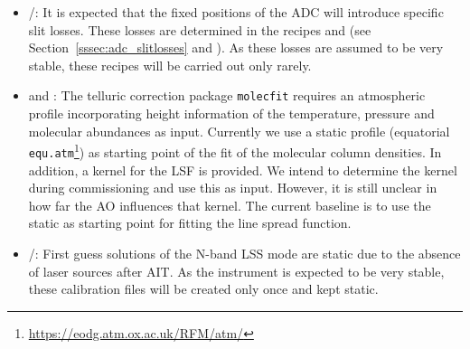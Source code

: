 \begin{itemize}
    \item \hyperref[dataitem:lm_adc_slitloss]{}/\hyperref[dataitem:n_adc_slitloss]{}: It is expected that the fixed positions of the \ac{ADC} will introduce specific slit losses. These losses are determined in the recipes \hyperref[rec:metis_lm_adc_slitloss]{} and \hyperref[rec:metis_n_adc_slitloss]{} (see Section~\ref{sssec:adc_slitlosses} and \cite{METIS-calibration_plan}). As these losses are assumed to be very stable, these recipes will be carried out only rarely.
    \item \hyperref[dataitem:atm_profile]{} and \hyperref[dataitem:lsf_kernel]{}: The telluric correction package \texttt{molecfit} requires an atmospheric profile incorporating height information of the temperature, pressure and molecular abundances as input. Currently we use a static profile (equatorial \texttt{equ.atm}\footnote{\url{https://eodg.atm.ox.ac.uk/RFM/atm/}}) as starting point of the fit of the molecular column densities. In addition, a kernel for the \ac{LSF} is provided. We intend to determine the kernel during commissioning and use this as input. However, it is still unclear in how far the \ac{AO} influences that kernel. The current baseline is to use the static \hyperref[dataitem:lsf_kernel]{} as starting point for fitting the line spread function.
    \item \hyperref[dataitem:n_lss_dist_sol]{}/\hyperref[dataitem:n_lss_wave_guess]{}: First guess solutions of the N-band LSS mode are static due to the absence of laser sources after \ac{AIT}. As the instrument is expected to be very stable, these calibration files will be created only once and kept static.
\end{itemize}
